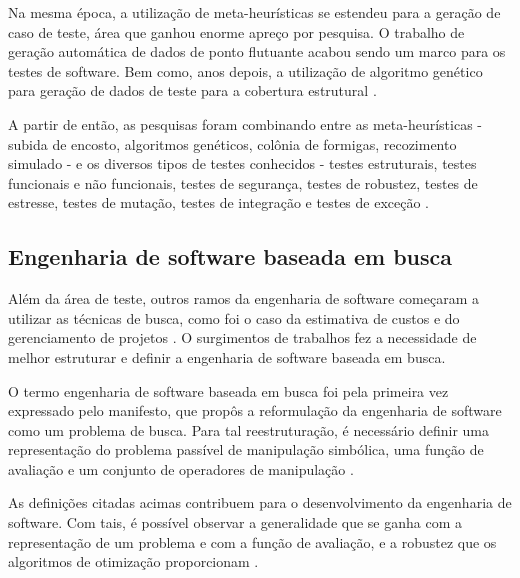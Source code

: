 Na mesma época, a utilização de meta-heurísticas se estendeu para a geração de
caso de teste, área que ganhou enorme apreço por pesquisa. O trabalho de geração
automática de dados de ponto flutuante \cite{miller1976automatic} acabou sendo
um marco para os testes de software. Bem como, anos depois, a utilização de
algoritmo genético para geração de dados de teste para a cobertura estrutural
\cite{xanthakis1992application}.

A partir de então, as pesquisas foram combinando entre as meta-heurísticas -
subida de encosto, algoritmos genéticos, colônia de formigas, recozimento
simulado - e os diversos tipos de testes  conhecidos - testes estruturais,
testes funcionais e não funcionais, testes de segurança, testes de robustez,
testes de estresse, testes de mutação, testes de integração e testes de exceção
\cite{harman2009search}.

\subsection{Engenharia de software baseada em busca}

Além da área de teste, outros ramos da engenharia de software começaram a
utilizar as técnicas de busca, como foi o caso da estimativa de custos e do
gerenciamento de projetos \cite{de2011ten}. O surgimentos de trabalhos fez a
necessidade de melhor estruturar e definir a engenharia de software baseada em
busca.

O termo engenharia de software baseada em busca foi pela primeira vez expressado
pelo manifesto, que propôs a reformulação da engenharia de software como um
problema de busca. Para tal reestruturação, é necessário definir uma
representação do problema passível de manipulação simbólica, uma função de
avaliação e um conjunto de operadores de manipulação \cite{harman2001search}.

As definições citadas acimas contribuem para o desenvolvimento da engenharia de
software. Com tais, é possível observar a generalidade que se ganha com a
representação de um problema e com a função de avaliação, e a robustez que os
algoritmos de otimização proporcionam \cite{harman2012search}. 


